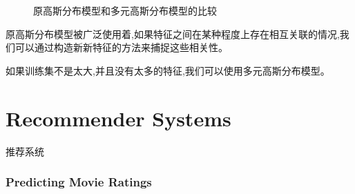 \documentclass{article}
\begin{document}
\begin{CJK}{UTF8}{gbsn}
\begin{figure}[H]
\label{fig:977}
\caption{原高斯分布模型和多元高斯分布模型的比较}
\end{figure}
\subparagraph{}
原高斯分布模型被广泛使用着,如果特征之间在某种程度上存在相互关联的情况,我们可以通过构造新新特征的方法来捕捉这些相关性。
\subparagraph{}
如果训练集不是太大,并且没有太多的特征,我们可以使用多元高斯分布模型。
\begin{figure}[H]
\label{fig:980}
\end{figure}
\begin{figure}[H]
\label{fig:981}
\end{figure}
\begin{figure}[H]
\label{fig:982}
\end{figure}
\begin{figure}[H]
\label{fig:983}
\end{figure}
\begin{figure}[H]
\label{fig:984}
\end{figure}
\begin{figure}[H]
\label{fig:985}
\end{figure}
\begin{figure}[H]
\label{fig:986}
\end{figure}
\part{Recommender Systems}
\subparagraph{}
推荐系统
\section{Predicting Movie Ratings}

\end{CJK}
\end{document}
